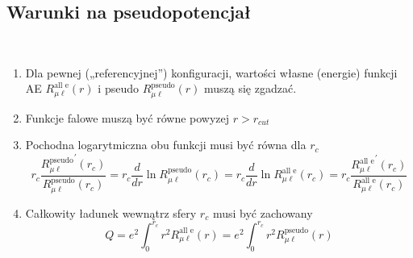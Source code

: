 \subsection{Warunki na pseudopotencjał}
~\\
\begin{enumerate}
	\item Dla pewnej („referencyjnej”) konfiguracji, wartości własne (energie) funkcji AE $R^{\text{all e}}_{\mu \ell}(r)$ i pseudo $ R^{\text{pseudo}}_{\mu \ell}(r)$ muszą się zgadzać.
	\item Funkcje falowe muszą być równe powyzej $r>r_{cut}$
	\item Pochodna logarytmiczna obu funkcji musi być równa dla $r_c$ 
	$$
	r_c\frac{{R^{\text{pseudo}}_{\mu \ell}}^{'}(r_c)}{R^{\text{pseudo}}_{\mu \ell}(r_c)} =
	\boxed{
	r_c \frac{d}{dr} \ln{R^{\text{pseudo}}_{\mu \ell}(r_c)} = 
	r_c \frac{d}{dr} \ln{R^{\text{all e}}_{\mu \ell}(r_c)} = 
	}
	r_c\frac{{R^{\text{all e}}_{\mu \ell}}^{'}(r_c)}{R^{\text{all e}}_{\mu \ell}(r_c)}
	$$
	\item Całkowity ładunek wewnątrz sfery $r_c$ musi być zachowany
	$$ \boxed{
	Q = e^2 \int_{0}^{r_c} r^2 R^{\text{all e}}_{\mu \ell}(r) =
	e^2 \int_{0}^{r_c} r^2 R^{\text{pseudo}}_{\mu \ell}(r) }
	$$
\end{enumerate}